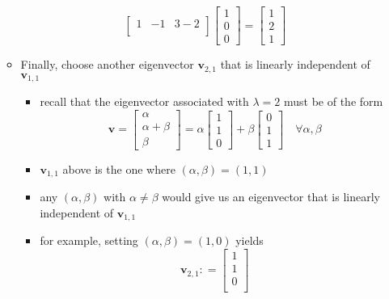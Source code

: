 \documentclass[12pt,a4paper]{article}
\begin{document}
\begin{itemize}
\begin{itemize}
\begin{equation}
\begin{bmatrix}
          1 & -1 & 3-2 \\
        \end{bmatrix}
        \begin{bmatrix}
          1 \\ 0 \\ 0
        \end{bmatrix}
        =
        \begin{bmatrix}
          1 \\ 2 \\ 1
        \end{bmatrix}
      \end{equation}
    \item Finally, choose another eigenvector $\bm{v}_{2,1}$
      that is linearly independent of $\bm{v}_{1,1}$
      \begin{itemize}
      \item recall that the eigenvector associated with $\lambda=2$ must be of the form
    \begin{equation}\nonumber%
      \bm{v}
      =
      \begin{bmatrix}
        \alpha \\ \alpha + \beta \\ \beta
      \end{bmatrix}
      =
      \alpha
      \begin{bmatrix}
        1 \\ 1 \\ 0
      \end{bmatrix}
      +
      \beta
      \begin{bmatrix}
        0 \\ 1 \\ 1
      \end{bmatrix}
      \quad \forall \alpha, \beta 
    \end{equation}
  \item $\bm{v}_{1,1}$ above is the one where $(\alpha,\beta)=(1,1)$
  \item any $(\alpha,\beta)$ with $\alpha \neq \beta$ would give us an eigenvector that is linearly independent of $\bm{v}_{1,1}$
  \item for example, setting $(\alpha,\beta) =(1, 0)$ yields
    \begin{equation}\nonumber%
      \bm{v}_{2,1} : =
      \begin{bmatrix}
        1 \\
        1 \\
        0 \\
      \end{bmatrix}
    \end{equation}
  \end{itemize}
    

\end{itemize}
\end{itemize}
\end{document}

